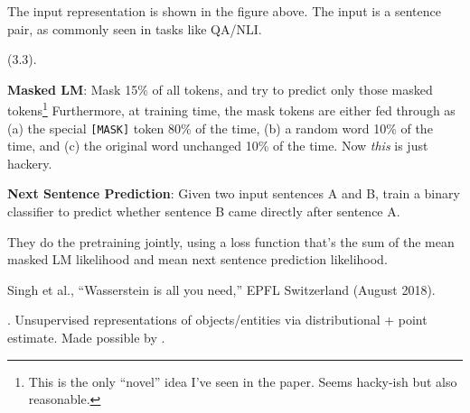\documentclass[11pt]{article}
\newcommand\myspace[1][]{\vspace{#1\bigskipamount}}
\newcommand\p{\Needspace{10\baselineskip} \noindent}
\begin{document}
The input representation is shown in the figure above. The input is a sentence pair, as commonly seen in tasks like QA/NLI. 

\myspace
\p {} (3.3). 
\begin{compactenum}
	\item \textbf{Masked LM}: Mask 15\% of all tokens, and try to predict only those masked tokens\footnote{This is the only ``novel'' idea I've seen in the paper. Seems hacky-ish but also reasonable.} Furthermore, at training time, the mask tokens are either fed through as (a) the special \texttt{[MASK]} token 80\% of the time, (b) a random word 10\% of the time, and (c) the original word unchanged 10\% of the time. Now \textit{this} is just hackery. 
	
	\item \textbf{Next Sentence Prediction}: Given two input sentences A and B, train a binary classifier to predict whether sentence B came directly after sentence A. 
\end{compactenum}
They do the pretraining jointly, using a loss function that's the sum of the mean masked LM likelihood and mean next sentence prediction likelihood. 



\vspace{-1em}
{\footnotesize Singh et al., ``Wasserstein is all you need,''  EPFL Switzerland (August 2018).}

\p {}. Unsupervised representations of objects/entities via distributional + point estimate. Made possible by . 
\end{document}
